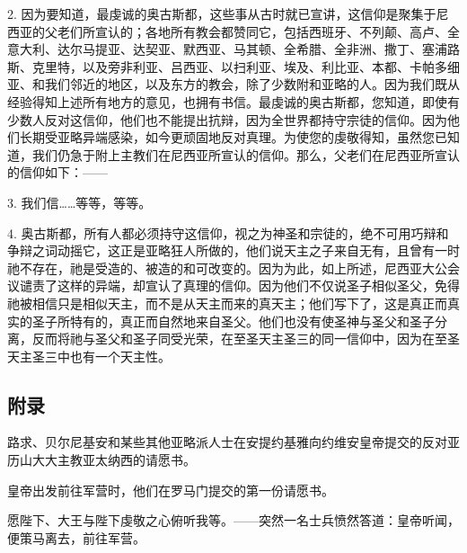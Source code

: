 2. 因为要知道，最虔诚的奥古斯都，这些事从古时就已宣讲，这信仰是聚集于尼西亚的父老们所宣认的；各地所有教会都赞同它，包括西班牙、不列颠、高卢、全意大利、达尔马提亚、达契亚、默西亚、马其顿、全希腊、全非洲、撒丁、塞浦路斯、克里特，以及旁非利亚、吕西亚、以扫利亚、埃及、利比亚、本都、卡帕多细亚、和我们邻近的地区，以及东方的教会，除了少数附和亚略的人。因为我们既从经验得知上述所有地方的意见，也拥有书信。最虔诚的奥古斯都，您知道，即使有少数人反对这信仰，他们也不能提出抗辩，因为全世界都持守宗徒的信仰。因为他们长期受亚略异端感染，如今更顽固地反对真理。为使您的虔敬得知，虽然您已知道，我们仍急于附上主教们在尼西亚所宣认的信仰。那么，父老们在尼西亚所宣认的信仰如下：——\par

3. 我们信……等等，等等。\par

4. 奥古斯都，所有人都必须持守这信仰，视之为神圣和宗徒的，绝不可用巧辩和争辩之词动摇它，这正是亚略狂人所做的，他们说天主之子来自无有，且曾有一时祂不存在，祂是受造的、被造的和可改变的。因为为此，如上所述，尼西亚大公会议谴责了这样的异端，却宣认了真理的信仰。因为他们不仅说圣子相似圣父，免得祂被相信只是相似天主，而不是从天主而来的真天主；他们写下了，这是真正而真实的圣子所特有的，真正而自然地来自圣父。他们也没有使圣神与圣父和圣子分离，反而将祂与圣父和圣子同受光荣，在至圣天主圣三的同一信仰中，因为在至圣天主圣三中也有一个天主性。\par


\subsection{附录}

路求、贝尔尼基安和某些其他亚略派人士在安提约基雅向约维安皇帝提交的反对亚历山大大主教亚太纳西的请愿书。\par

皇帝出发前往军营时，他们在罗马门提交的第一份请愿书。\par

愿陛下、大王与陛下虔敬之心俯听我等。——突然一名士兵愤然答道：皇帝听闻，便策马离去，前往军营。\par

